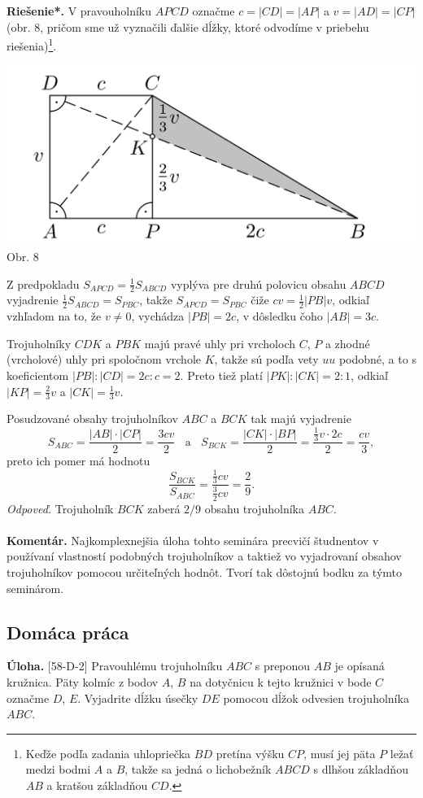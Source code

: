 \documentclass[11pt,a4paper,oneside,final]{book}
\newcommand{\kom}{\textbf{Komentár.} }
\newcommand{\ul}{\textbf{Úloha.} }
\newcommand{\rieh}{\textbf{Riešenie*.} }
\begin{document}
\rieh V pravouholníku $APCD$ označme $c = |CD| = |AP|$ a $v = |AD| = |CP|$ (obr. 8, pričom sme už vyznačili ďalšie dĺžky, ktoré odvodíme v priebehu riešenia)\footnote{Keďže podľa zadania uhlopriečka $BD$ pretína výšku $CP$, musí jej päta $P$ ležať medzi bodmi $A$ a $B$, takže sa jedná o  lichobežník $ABCD$ s dlhšou základňou $AB$ a kratšou základňou $CD$.}.
\begin{center}
\includegraphics[scale=0.3]{65K3}\\

Obr. 8
\end{center}
Z predpokladu $S_{APCD} =\frac{1}{2}S_{ABCD}$ vyplýva pre druhú polovicu obsahu $ABCD$ vyjadrenie $\frac{1}{2}S_{ABCD} = S_{PBC}$, takže $S_{APCD} = S_{PBC}$ čiže $cv =\frac{1}{2}|PB|v$, odkiaľ vzhľadom na to, že $v \neq 0$, vychádza $|PB| = 2c$, v dôsledku čoho $|AB| = 3c$.

Trojuholníky $CDK$ a $PBK$ majú pravé uhly pri vrcholoch $C$, $P$ a zhodné (vrcholové) uhly pri spoločnom vrchole $K$, takže sú podľa vety $uu$ podobné, a to s koeficientom $|PB| : |CD| = 2c : c = 2$. Preto tiež platí $|PK| : |CK| = 2 : 1$, odkiaľ $|KP| =\frac{2}{3}v$ a $|CK| =\frac{1}{3}v$.

Posudzované obsahy trojuholníkov $ABC$ a $BCK$ tak majú vyjadrenie
$$S_{ABC} = \frac{|AB| \cdot |CP|}{2}=\frac{3cv}{2} \ \ \ \ \text{a} \ \ \ \  S_{BCK} =\frac{|CK|\cdot |BP|}{2}=\frac{\frac{1}{3}v\cdot 2c}{2}=\frac{cv}{3},$$
preto ich pomer má hodnotu
$$\frac{S_{BCK}}{S_{ABC}}=\frac{\frac{1}{3}cv}{\frac{3}{2}cv}=\frac{2}{9}.$$
\textit{Odpoveď.} Trojuholník $BCK$ zaberá $2/9$ obsahu trojuholníka $ABC$.\\
\\
\kom Najkomplexnejšia úloha tohto seminára precvičí študnentov v používaní vlastností podobných trojuholníkov a taktiež vo vyjadrovaní obsahov trojuholníkov pomocou určiteľných hodnôt. Tvorí tak dôstojnú bodku za týmto seminárom.

\subsection*{Domáca práca}
\begin{tcolorbox}[breakable,notitle,boxrule=0pt,colback=light-gray,colframe=light-gray]\ul [58-D-2] Pravouhlému trojuholníku $ABC$ s preponou $AB$ je opísaná kružnica. Päty kolmíc z bodov $A$, $B$ na dotyčnicu k tejto kružnici v bode $C$ označme $D$, $E$. Vyjadrite dĺžku úsečky $DE$ pomocou dĺžok odvesien trojuholníka $ABC$.

\end{tcolorbox}
\end{document}
